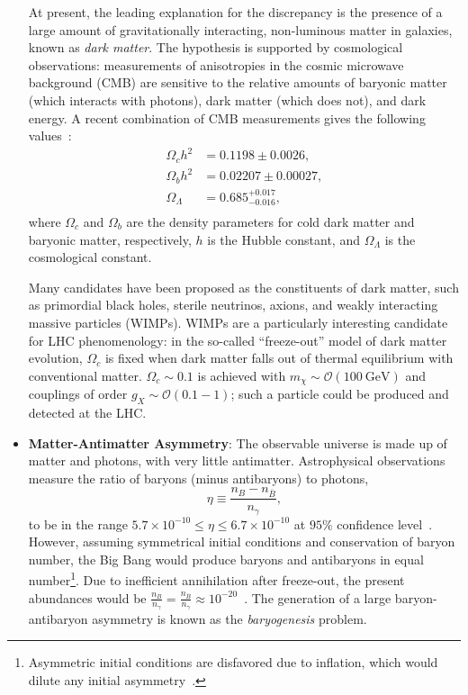 \begin{itemize}
	At present, the leading explanation for the discrepancy is the presence of a large amount of gravitationally interacting, non-luminous matter in galaxies, known as \emph{dark matter}. The hypothesis is supported by cosmological observations: measurements of anisotropies in the cosmic microwave background (CMB) are sensitive to the relative amounts of baryonic matter (which interacts with photons), dark matter (which does not), and dark energy. A recent combination of CMB measurements gives the following values~\cite{Ade:1530686}:
	\begin{align}
		\Omega_{c}h^2 &= 0.1198 \pm 0.0026, \\
		\Omega_{b}h^2 &= 0.02207 \pm 0.00027, \\
		\Omega_{\Lambda} &= 0.685^{+0.017}_{-0.016}, \\
	\end{align}
	where $\Omega_{c}$ and $\Omega_{b}$ are the density parameters for cold dark matter and baryonic matter, respectively, $h$ is the Hubble constant, and $\Omega_{\Lambda}$ is the cosmological constant. 

	Many candidates have been proposed as the constituents of dark matter, such as primordial black holes, sterile neutrinos, axions, and weakly interacting massive particles (WIMPs). WIMPs are a particularly interesting candidate for LHC phenomenology: in the so-called ``freeze-out'' model of dark matter evolution, $\Omega_c$ is fixed when dark matter falls out of thermal equilibrium with conventional matter. $\Omega_c\sim0.1$ is achieved with $m_{\chi}\sim \mathcal{O}(100~\mbox{GeV})$ and couplings of order $g_X\sim\mathcal{O}(0.1-1)$; such a particle could be produced and detected at the LHC. 

	\item \textbf{Matter-Antimatter Asymmetry}: The observable universe is made up of matter and photons, with very little antimatter. Astrophysical observations measure the ratio of baryons (minus antibaryons) to photons,
	\begin{equation}\label{eqn:baryon-photon-ratio}
		\eta \equiv \frac{n_B - n_{\overline{B}}}{n_{\gamma}}, 
	\end{equation}
	to be in the range $5.7\times 10^{-10} \leq \eta \leq 6.7\times 10^{-10}$ at $95\%$ confidence level~\cite{pdg}. However, assuming symmetrical initial conditions and conservation of baryon number, the Big Bang would produce baryons and antibaryons in equal number\footnote{Asymmetric initial conditions are disfavored due to inflation, which would dilute any initial asymmetry~\cite{Cline:2006ts}.}. Due to inefficient annihilation after freeze-out, the present abundances would be $\frac{n_B}{n_{\gamma}} = \frac{n_{\overline{B}}}{n_{\gamma}} \approx 10^{-20}$~\cite{Cline:2006ts}. The generation of a large baryon-antibaryon asymmetry is known as the \emph{baryogenesis} problem.


\end{itemize}
